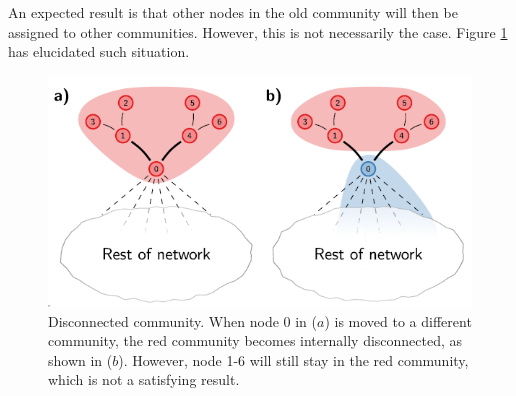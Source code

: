 \documentclass[11pt]{article}
\begin{document}
\noindent An expected result is that other nodes in the old community will then be assigned to other communities. However, this is not necessarily the case. Figure \ref{fig:drawback} has elucidated such situation.
\begin{figure}[ht]
  \centering
  \includegraphics[scale=0.75]{figures/louvain_drawback.png}
  \caption{Disconnected community. When node 0 in ($a$) is moved to a different community, the red community becomes internally disconnected, as shown in ($b$). However, node 1-6 will still stay in the red community, which is not a satisfying result.\cite{leiden}}
  \label{fig:drawback}
\end{figure}
\end{document}
